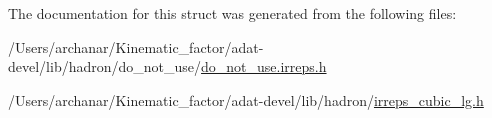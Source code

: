 The documentation for this struct was generated from the following files\+:\begin{DoxyCompactItemize}
\item 
/\+Users/archanar/\+Kinematic\+\_\+factor/adat-\/devel/lib/hadron/do\+\_\+not\+\_\+use/\mbox{\hyperlink{adat-devel_2lib_2hadron_2do__not__use_2do__not__use_8irreps_8h}{do\+\_\+not\+\_\+use.\+irreps.\+h}}\item 
/\+Users/archanar/\+Kinematic\+\_\+factor/adat-\/devel/lib/hadron/\mbox{\hyperlink{adat-devel_2lib_2hadron_2irreps__cubic__lg_8h}{irreps\+\_\+cubic\+\_\+lg.\+h}}\end{DoxyCompactItemize}
